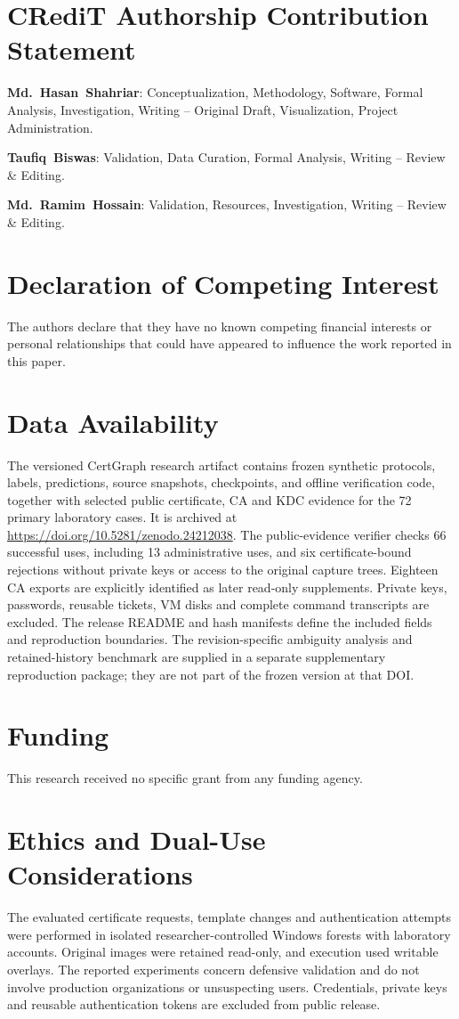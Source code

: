 \section*{CRediT Authorship Contribution Statement}
\noindent\textbf{Md.~Hasan~Shahriar}: Conceptualization, Methodology, Software, Formal Analysis, Investigation, Writing -- Original Draft, Visualization, Project Administration.
\par\smallskip\noindent\textbf{Taufiq~Biswas}: Validation, Data Curation, Formal Analysis, Writing -- Review \& Editing.
\par\smallskip\noindent\textbf{Md.~Ramim~Hossain}: Validation, Resources, Investigation, Writing -- Review \& Editing.

\section*{Declaration of Competing Interest}
\noindent The authors declare that they have no known competing financial interests or personal relationships that could have appeared to influence the work reported in this paper.

\section*{Data Availability}
\noindent The versioned CertGraph research artifact contains frozen synthetic protocols, labels, predictions, source snapshots, checkpoints, and offline verification code, together with selected public certificate, CA and KDC evidence for the 72 primary laboratory cases. It is archived at \url{https://doi.org/10.5281/zenodo.24212038}. The public-evidence verifier checks 66 successful uses, including 13 administrative uses, and six certificate-bound rejections without private keys or access to the original capture trees. Eighteen CA exports are explicitly identified as later read-only supplements. Private keys, passwords, reusable tickets, VM disks and complete command transcripts are excluded. The release README and hash manifests define the included fields and reproduction boundaries. The revision-specific ambiguity analysis and retained-history benchmark are supplied in a separate supplementary reproduction package; they are not part of the frozen version at that DOI.

\section*{Funding}
\noindent This research received no specific grant from any funding agency.

\section*{Ethics and Dual-Use Considerations}
\noindent The evaluated certificate requests, template changes and authentication attempts were performed in isolated researcher-controlled Windows forests with laboratory accounts. Original images were retained read-only, and execution used writable overlays. The reported experiments concern defensive validation and do not involve production organizations or unsuspecting users. Credentials, private keys and reusable authentication tokens are excluded from public release.
